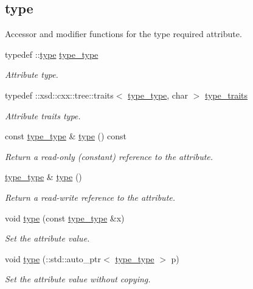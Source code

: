 \subsection*{type}
\label{_amgrp599dcce2998a6b40b1e38e8c6006cb0a}%
Accessor and modifier functions for the type required attribute. \begin{DoxyCompactItemize}
\item 
typedef \+::\hyperlink{classtype}{type} \hyperlink{classDataArray__t_a484a0509e4f141d9970d75881703a51e}{type\+\_\+type}
\begin{DoxyCompactList}\small\item\em Attribute type. \end{DoxyCompactList}\item 
typedef \+::xsd\+::cxx\+::tree\+::traits$<$ \hyperlink{classDataArray__t_a484a0509e4f141d9970d75881703a51e}{type\+\_\+type}, char $>$ \hyperlink{classDataArray__t_af1dc5f097a8645ae42b57eb3a0b10fa2}{type\+\_\+traits}
\begin{DoxyCompactList}\small\item\em Attribute traits type. \end{DoxyCompactList}\item 
const \hyperlink{classDataArray__t_a484a0509e4f141d9970d75881703a51e}{type\+\_\+type} \& \hyperlink{classDataArray__t_a6ec3c246d1a2fddc7052bcde2cb6bdf7}{type} () const 
\begin{DoxyCompactList}\small\item\em Return a read-\/only (constant) reference to the attribute. \end{DoxyCompactList}\item 
\hyperlink{classDataArray__t_a484a0509e4f141d9970d75881703a51e}{type\+\_\+type} \& \hyperlink{classDataArray__t_a29f3ed42a5bf8df9437ece5f63c02301}{type} ()
\begin{DoxyCompactList}\small\item\em Return a read-\/write reference to the attribute. \end{DoxyCompactList}\item 
void \hyperlink{classDataArray__t_ae4fd6c47e992055ec42cc1949b60da2a}{type} (const \hyperlink{classDataArray__t_a484a0509e4f141d9970d75881703a51e}{type\+\_\+type} \&x)
\begin{DoxyCompactList}\small\item\em Set the attribute value. \end{DoxyCompactList}\item 
void \hyperlink{classDataArray__t_afa90d226889ba3e7baa5c8e9dba594d2}{type} (\+::std\+::auto\+\_\+ptr$<$ \hyperlink{classDataArray__t_a484a0509e4f141d9970d75881703a51e}{type\+\_\+type} $>$ p)
\begin{DoxyCompactList}\small\item\em Set the attribute value without copying. \end{DoxyCompactList}\end{DoxyCompactItemize}

